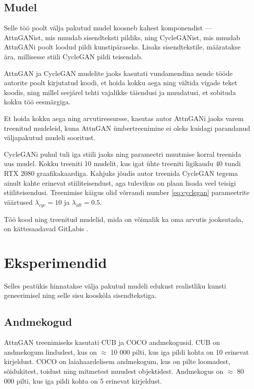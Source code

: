 \documentclass{vilgym}
\begin{document}
	\subsection{Mudel}
	Selle töö poolt välja pakutud mudel koosneb kahest komponendist --- AttnGANist, mis muudab sisendteksti pildiks, ning CycleGANist, mis muudab AttnGANi poolt loodud pildi kunstipäraseks. Lisaks sisendtekstile, määratakse ära, millisesse stiili CycleGAN pildi teisendab.

	AttnGAN ja CycleGAN mudelite jaoks kasutati vundamendina nende tööde autorite poolt kirjutatud koodi, et hoida kokku aega ning vältida vigade teket koodis, ning millel seejärel tehti vajalikke täiendusi ja muudatusi, et sobituda kokku töö eesmärgiga.

	Et hoida kokku aega ning arvutiressursse, kasutas autor AttnGANi jaoks varem treenitud mudeleid, kuna AttnGAN ümbertreenimine ei oleks kuidagi parandanud väljapakutud mudeli sooritust.

	CycleGANi puhul tuli iga stiili jaoks ning parameetri muutmise korral treenida uus mudel. Kokku treeniti 10  mudelit, kus igat ühte treeniti ligikaudu 40 tundi RTX 2080 graafikakaardiga. Kahjuks jõudis autor treenida CycleGAN tegema ainult kahte erinevat stiiliteisendust, aga tulevikus on plaan lisada veel teisigi stiiliteisendusi. Treenimise käigus olid võrrandi number \ref{eq:cyclegan} parameetrite väärtused $ \lambda_{cyc} = 10 $ ja $ \lambda_{idt} = 0.5 $.

	Töö kood ning treenitud mudelid, mida on võimalik ka oma arvutis jooksutada, on kättesaadavad GitLabis \parencite{text2art-gan}.

	\section{Eksperimendid}
	Selles peatükis hinnatakse välja pakutud mudeli edukust realistliku kunsti geneerimisel ning selle sisu kooskõla sisendtekstiga.

	\subsection{Andmekogud}
	AttnGAN treenimiseks kasutati CUB \parencite{cub} ja COCO \parencite{srgan} andmekogusid. CUB on andmekogum lindudest, kus on $\approx$ 10 000 pilti, kus iga pildi kohta on 10 erinevat kirjeldust. COCO on laiahaardelisem andmekogum, kus on pilte loomadest, sõidukitest, toidust ning mitmetest muudest objektidest. Andmekogus on $\approx$ 80 000 pilti, kus iga pildi kohta on 5 erinevat kirjeldust.
\end{document}
